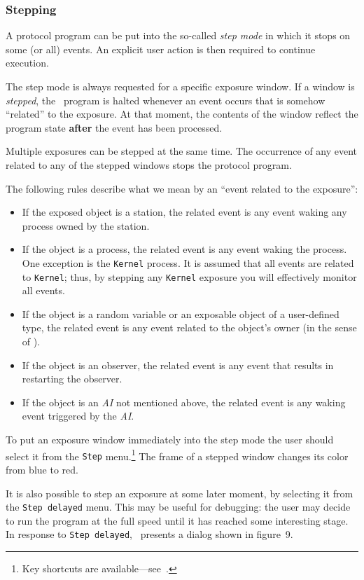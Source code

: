 \subsubsection{Stepping}
\label{rm_ds_wm_sm}

A protocol program can be put into the so-called
{\em step mode\/} in which it stops on some (or all) events.
An explicit user action is then required to continue execution.

The step mode is always requested for a specific exposure window.
If a window is {\em stepped}, the \smurph\ program is halted whenever an event
occurs that is somehow ``related'' to the exposure.
At that moment,
the contents of the window reflect the program state {\bf after}
the event has been processed.

Multiple exposures can be stepped at the same time.
The occurrence of any event related to any of the stepped windows stops the
protocol program.

The following rules describe what we mean by an
``event related to the exposure'':
\begin{itemize}
\item
If the exposed object is a station, the related event is any
event waking any process owned by the station.
\item
If the object is a process, the related event is any event waking the process.
One exception is the {\tt Kernel} process.
It is assumed that all events are related to {\tt Kernel}; thus, by
stepping any {\tt Kernel} exposure you will effectively monitor all events.
\item
If the object is a random variable or an
exposable object of a user-defined type,
the related event is any event related to the object's owner (in the
sense of ).
\item
If the object is an observer, the related event is any
event that results in restarting the observer.
\item
If the object is an {\em AI\/} not mentioned above, the related event
is any waking event triggered by the {\em AI}.
\end{itemize}

To put an exposure window immediately
into the step mode the user should select it from the {\tt Step}
menu.\footnote{Key shortcuts are available---see~.}
The frame of a stepped window changes its color from blue to red.

It is also possible to step an exposure at some later moment, by selecting
it from the {\tt Step~delayed} menu.
This may be useful for debugging: the user may decide to run the program
at the full speed until it has reached some interesting stage.
In response to {\tt Step~delayed}, \dsd\ presents a dialog shown
in
figure~9.

